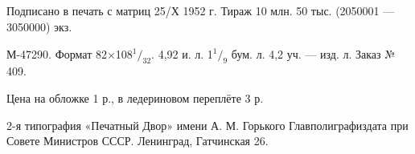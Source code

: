 \documentclass[12pt, a4paper, openany]{book}
\newcommand*\rfrac[2]{{}^{#1}\!/_{#2}}
\begin{document}
\begin{center}
\ \\



\ \\



\ \\



\ \\



\ \\



\ \\



\ \\



\ \\



\ \\





\parbox{17,2cm}{%



\sloppy\setlength\parfillskip{0pt}



Подписано в печать с матриц 25/Х 1952 г. Тираж 10 млн. 50 тыс. (2050001 — 3050000) экз.



М-47290. Формат 82$\times$108$\rfrac{1}{32}$. 4,92 и. л. 1$\rfrac{1}{9}$ бум. л. 4,2 уч. — изд. л. Заказ № 409.



}







Цена на обложке 1 р., в ледериновом переплёте 3 р.





\hrulefill



2-я типография «Печатный Двор» имени А. М. Горького Главполиграфиздата при Совете Министров СССР. Ленинград, Гатчинская 26.























\end{center}
\end{document}
